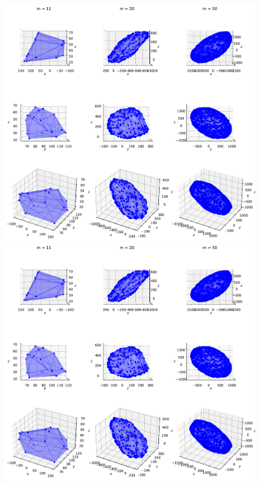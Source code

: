 \begin{figure}[!htb]
\begin{minipage}{1\linewidth}
    \end{minipage}
    \begin{minipage}{1\linewidth}
        \centering
        \includegraphics[trim={0 255 0 300},clip, width=0.9\linewidth]{img/chapter_3/zonotopes_looks_like_ellipsoids.pdf}
    \end{minipage}
    \begin{minipage}{1\linewidth}
        \centering
        \includegraphics[trim={0 0 0 500},clip, width=0.9\linewidth]{img/chapter_3/zonotopes_looks_like_ellipsoids.pdf}
    \end{minipage}
    

\end{figure}
